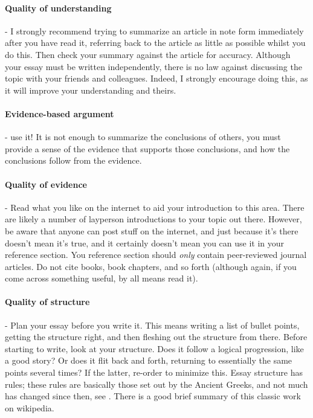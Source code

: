 \documentclass[11pt]{article}
\begin{document}
\paragraph{Quality of understanding} - I strongly recommend trying to summarize an article in note form immediately after you have read it, referring back to the article as little as possible whilst you do this. Then check your summary against the article for accuracy. Although your essay must be written independently, there is no law against discussing the topic with your friends and colleagues. Indeed, I strongly encourage doing this, as it will improve your understanding and theirs.

\paragraph{Evidence-based argument} - use it! It is not enough to summarize the conclusions of others, you must provide a sense of the evidence that supports those conclusions, and how the conclusions follow from the evidence.

\paragraph{Quality of evidence} - Read what you like on the internet to aid your introduction to this area. There are likely a number of layperson introductions to your topic out there. However, be aware that anyone can post stuff on the internet, and just because it's there doesn't mean it's true, and it certainly doesn't mean you can use it in your reference section. You reference section should \emph{only} contain peer-reviewed journal articles. Do not cite books, book chapters, and so forth (although again, if you come across something useful, by all means read it).

\paragraph{Quality of structure} - Plan your essay before you write it. This means writing a list of bullet points, getting the structure right, and then fleshing out the structure from there. Before starting to write, look at your structure. Does it follow a logical progression, like a good story? Or does it flit back and forth, returning to essentially the same points several times? If the latter, re-order to minimize this. Essay structure has rules; these rules are basically those set out by the Ancient Greeks, and not much has changed since then, see . There is a good brief summary of this classic work on wikipedia.
\end{document}
